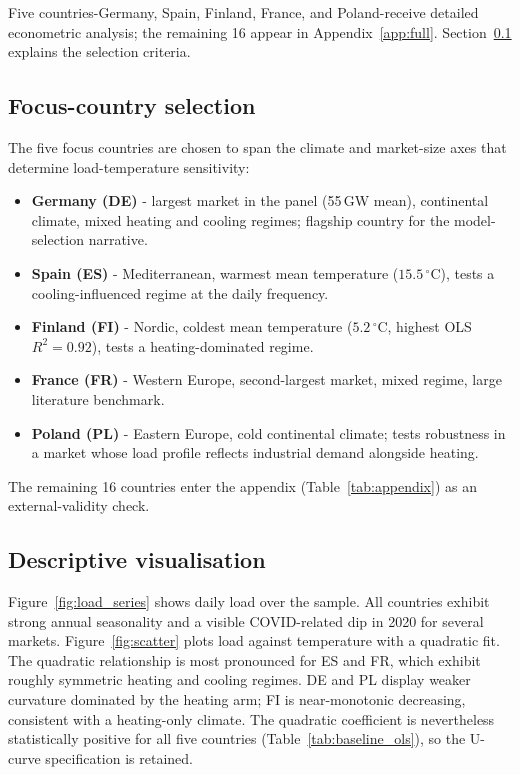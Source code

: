 \documentclass[12pt,a4paper]{article}
\begin{document}
\noindent Five countries-Germany, Spain, Finland, France, and Poland-receive detailed econometric analysis; the remaining 16 appear in Appendix~\ref{app:full}. Section~\ref{sec:focus-countries} explains the selection criteria.


\subsection{Focus-country selection}
\label{sec:focus-countries}

The five focus countries are chosen to span the climate and market-size axes that determine load-temperature sensitivity:
\begin{itemize}
  \item \textbf{Germany (DE)} - largest market in the panel (55\,GW mean), continental climate, mixed heating and cooling regimes; flagship country for the model-selection narrative.
  \item \textbf{Spain (ES)} - Mediterranean, warmest mean temperature ($15.5\,^\circ$C), tests a cooling-influenced regime at the daily frequency.
  \item \textbf{Finland (FI)} - Nordic, coldest mean temperature ($5.2\,^\circ$C, highest OLS $R^2=0.92$), tests a heating-dominated regime.
  \item \textbf{France (FR)} - Western Europe, second-largest market, mixed regime, large literature benchmark.
  \item \textbf{Poland (PL)} - Eastern Europe, cold continental climate; tests robustness in a market whose load profile reflects industrial demand alongside heating.
\end{itemize}
The remaining 16 countries enter the appendix (Table~\ref{tab:appendix}) as an external-validity check.

\subsection{Descriptive visualisation}

Figure~\ref{fig:load_series} shows daily load over the sample. All countries exhibit strong annual seasonality and a visible COVID-related dip in 2020 for several markets. Figure~\ref{fig:scatter} plots load against temperature with a quadratic fit. The quadratic relationship is most pronounced for ES and FR, which exhibit roughly symmetric heating and cooling regimes. DE and PL display weaker curvature dominated by the heating arm; FI is near-monotonic decreasing, consistent with a heating-only climate. The quadratic coefficient is nevertheless statistically positive for all five countries (Table~\ref{tab:baseline_ols}), so the U-curve specification is retained.
\end{document}
